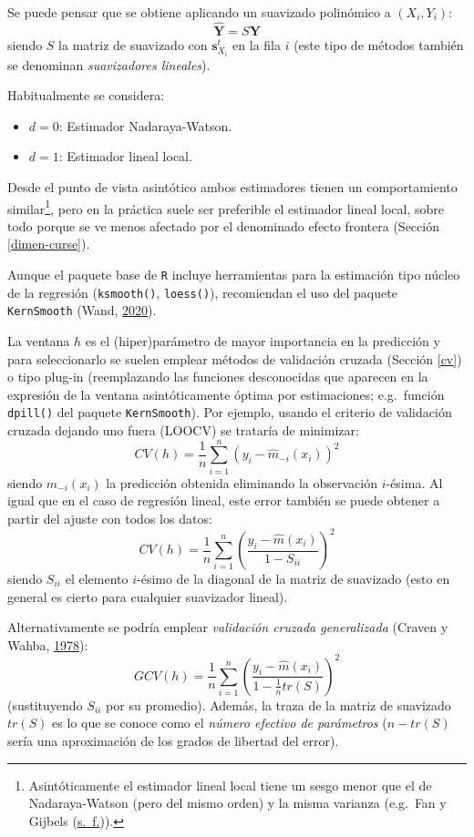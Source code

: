 \documentclass[
  spanish,
]{book}
\theoremstyle{break}
\theoremstyle{definition}
\theoremstyle{definition}
\theoremstyle{definition}
\theoremstyle{remark}
\begin{document}
Se puede pensar que se obtiene aplicando un suavizado polinómico a
\((X_i, Y_i)\):
\[\hat{\mathbf{Y}} = S\mathbf{Y}\]
siendo \(S\) la matriz de suavizado con \(\mathbf{s}_{X_{i}}^{t}\) en la fila \(i\) (este tipo de métodos también se denominan \emph{suavizadores lineales}).

Habitualmente se considera:

\begin{itemize}
\item
  \(d=0\): Estimador Nadaraya-Watson.
\item
  \(d=1\): Estimador lineal local.
\end{itemize}

Desde el punto de vista asintótico ambos estimadores tienen un comportamiento similar\footnote{Asintóticamente el estimador lineal local tiene un sesgo menor que el de Nadaraya-Watson (pero del mismo orden) y la misma varianza (e.g.~Fan y Gijbels (\protect\hyperlink{ref-fan1996}{s.~f.})).}, pero en la práctica suele ser preferible el estimador lineal local, sobre todo porque se ve menos afectado por el denominado efecto frontera (Sección \ref{dimen-curse}).

Aunque el paquete base de \texttt{R} incluye herramientas para la estimación tipo núcleo de la regresión (\texttt{ksmooth()}, \texttt{loess()}), recomiendan el uso del paquete \texttt{KernSmooth} (Wand, \protect\hyperlink{ref-R-KernSmooth}{2020}).

La ventana \(h\) es el (hiper)parámetro de mayor importancia en la predicción y para seleccionarlo se suelen emplear métodos de validación cruzada (Sección \ref{cv}) o tipo plug-in (reemplazando las funciones desconocidas que aparecen en la expresión de la ventana asintóticamente óptima por estimaciones; e.g.~función \texttt{dpill()} del paquete \texttt{KernSmooth}).
Por ejemplo, usando el criterio de validación cruzada dejando uno fuera (LOOCV) se trataría de minimizar:
\[CV(h)=\frac{1}{n}\sum_{i=1}^n(y_i-\hat{m}_{-i}(x_i))^2\]
siendo \(\hat{m}_{-i}(x_i)\) la predicción obtenida eliminando la observación \(i\)-ésima.
Al igual que en el caso de regresión lineal, este error también se puede obtener a partir del ajuste con todos los datos:
\[CV(h)=\frac{1}{n}\sum_{i=1}^n\left(\frac{y_i-\hat{m}(x_i)}{1 - S_{ii}}\right)^2\]
siendo \(S_{ii}\) el elemento \(i\)-ésimo de la diagonal de la matriz de suavizado (esto en general es cierto para cualquier suavizador lineal).

Alternativamente se podría emplear \emph{validación cruzada generalizada} (Craven y Wahba, \protect\hyperlink{ref-craven1978smoothing}{1978}):
\[GCV(h)=\frac{1}{n}\sum_{i=1}^n\left(\frac{y_i-\hat{m}(x_i)}{1 - \frac{1}{n}tr(S)}\right)^2\]
(sustituyendo \(S_{ii}\) por su promedio).
Además, la traza de la matriz de suavizado \(tr(S)\) es lo que se conoce como el \emph{número efectivo de parámetros} (\(n - tr(S)\) sería una aproximación de los grados de libertad del error).
\end{document}
